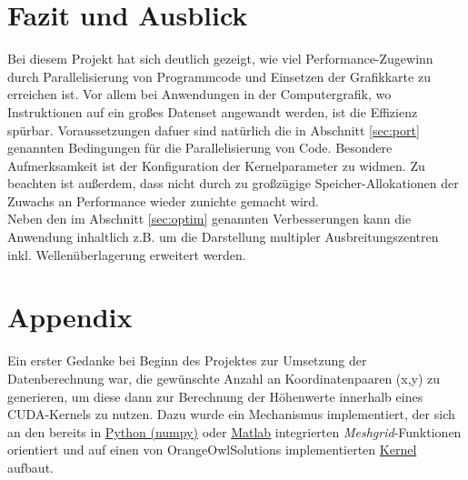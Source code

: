 \documentclass[conference]{IEEEtran}
\begin{document}
\section{Fazit und Ausblick}
Bei diesem Projekt hat sich deutlich gezeigt, wie viel Performance-Zugewinn durch Parallelisierung von Programmcode und Einsetzen der Grafikkarte zu erreichen ist. Vor allem bei Anwendungen in der Computergrafik, wo Instruktionen auf ein gro{\ss}es Datenset angewandt werden, ist die Effizienz sp\"urbar. Voraussetzungen dafuer sind nat\"urlich die in Abschnitt \ref{sec:port} genannten Bedingungen f\"ur die Parallelisierung von Code.
Besondere Aufmerksamkeit ist der Konfiguration der Kernelparameter zu widmen. 
Zu beachten ist außerdem, dass nicht durch zu gro{\ss}z\"ugige Speicher-Allokationen der Zuwachs an Performance wieder zunichte gemacht wird.\\
Neben den im Abschnitt \ref{sec:optim} genannten Verbesserungen kann die Anwendung inhaltlich z.B. um die Darstellung multipler Ausbreitungszentren inkl. Wellen\"uberlagerung erweitert werden.

\section{Appendix}
Ein erster Gedanke bei Beginn des Projektes zur Umsetzung der Datenberechnung war, die gew\"unschte Anzahl an Koordinatenpaaren (x,y) zu generieren, um diese dann zur Berechnung der H\"ohenwerte innerhalb eines CUDA-Kernels zu nutzen. Dazu wurde ein Mechanismus implementiert, der sich an den bereits in \href{https://docs.scipy.org/doc/numpy/reference/generated/numpy.meshgrid.html}{Python (numpy)} oder \href{https://de.mathworks.com/help/matlab/ref/meshgrid.html}{Matlab} integrierten \textit{Meshgrid}-Funktionen orientiert und auf einen  von OrangeOwlSolutions implementierten \href{https://github.com/OrangeOwlSolutions/CUDA-Utilities/blob/master/Matlab_like.cu#L69}{Kernel} aufbaut.
\end{document}
